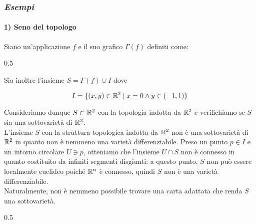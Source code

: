 \subsubsection{\textit{Esempi}}

\paragraph{1) Seno del topologo}

Siano un'applicazione $ f $ e il suo grafico $ \Gamma(f) $ definiti come:

	{0.5}{%
			}

Sia inoltre l'insieme $ S = \Gamma(f) \cup I $ dove

\begin{equation}
	I = \{ (x,y) \in \mathbb{R}^{2} \mid x=0 \wedge y \in (-1,1) \}
\end{equation}

Consideriamo dunque $ S \subset \mathbb{R}^{2} $ con la topologia indotta da $ \mathbb{R}^{2} $ e verifichiamo se $ S $ sia una sottovarietà di $ \mathbb{R}^{2} $.\\
L'insieme $ S $ con la struttura topologica indotta da $ \mathbb{R}^{2} $ non è una sottovarietà di $ \mathbb{R}^{2} $ in quanto non è nemmeno una varietà differenziabile. Preso un punto $ p \in I $ e un intorno circolare $ U \ni p $, otteniamo che l'insieme $ U \cap S $ non è connesso in quanto costituito da infiniti segmenti disgiunti: a questo punto, $ S $ non può essere localmente euclideo poiché $ \mathbb{R}^{n} $ è connesso, quindi $ S $ non è una varietà differenziabile.\\
Naturalmente, non è nemmeno possibile trovare una carta adattata che renda $ S $ una sottovarietà.

	{0.5}{%
			}

